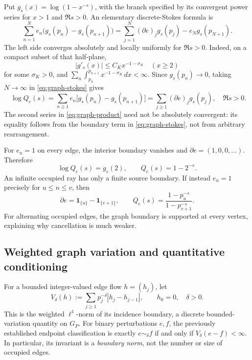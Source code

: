 \documentclass[12pt,letterpaper]{article}
\numberwithin{equation}{section}
\theoremstyle{remark}
\begin{document}
Put \(g_s(x)=\log(1-x^{-s})\), with the branch specified by its
convergent power series for \(x>1\) and \(\Re s>0\).
An elementary discrete-Stokes formula is
\begin{equation}\label{eq:graph-stokes}
 \sum_{n=1}^{N}e_n\bigl(g_s(p_n)-g_s(p_{n+1})\bigr)
 =\sum_{j=1}^{N}(\partial e)_j g_s(p_j)
       -e_Ng_s(p_{N+1}).
\end{equation}
The left side converges absolutely and locally uniformly for \(\Re s>0\).
Indeed, on a compact subset of that half-plane,
\[
 |g'_s(x)|\le C_K x^{-1-\sigma_K}\quad(x\ge2)
\]
for some \(\sigma_K>0\), and
\(\sum_n\int_{p_n}^{p_{n+1}}x^{-1-\sigma_K}\,dx<\infty\).
Since \(g_s(p_n)\to0\), taking \(N\to\infty\) in
\eqref{eq:graph-stokes} gives
\begin{equation}\label{eq:graph-product}
 \boxed{\quad
 \log Q_e(s)
 =\sum_{n\ge1}e_n\bigl[g_s(p_n)-g_s(p_{n+1})\bigr]
 =\sum_{j\ge1}(\partial e)_j g_s(p_j),\quad \Re s>0.
 \quad}
\end{equation}
The second series in \eqref{eq:graph-product} need not be absolutely
convergent: its equality follows from the boundary term in
\eqref{eq:graph-stokes}, not from arbitrary rearrangement.

For \(e_n=1\) on every edge, the interior boundary vanishes and
\(\partial e=(1,0,0,\ldots)\).  Therefore
\[
 \log Q_e(s)=g_s(2),\qquad Q_e(s)=1-2^{-s}.
\]
An infinite occupied ray has only a finite source boundary.  If instead
\(e_n=1\) precisely for \(u\le n\le v\), then
\[
 \partial e=\mathbf 1_{\{u\}}-\mathbf 1_{\{v+1\}},
 \qquad Q_e(s)=\frac{1-p_u^{-s}}{1-p_{v+1}^{-s}}.
\]
For alternating occupied edges, the graph boundary is supported at
every vertex, explaining why cancellation is much weaker.

\subsection{Weighted graph variation and quantitative conditioning}

For a bounded integer-valued edge flow \(h=(h_j)\), let
\begin{equation}\label{eq:graph-TV}
 V_\delta(h):=\sum_{j\ge1}p_j^{-\delta}
                  |h_j-h_{j-1}|,\qquad h_0=0,\quad\delta>0.
\end{equation}
This is the weighted \(\ell^1\)-norm of its incidence boundary,
a discrete bounded-variation quantity on \(G_P\).
For binary perturbations \(e,f\), the previously established endpoint
classification is exactly \(e\sim_\delta f\) if and only if
\(V_\delta(e-f)<\infty\).  In particular, its invariant is a
\emph{boundary norm}, not the number or size of occupied edges.
\end{document}
